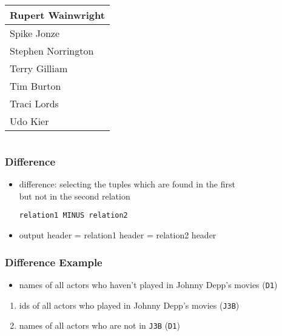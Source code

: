 \documentclass[dvipsnames]{beamer}
\theoremstyle{plain}
\begin{document}
\begin{frame}[fragile]
\begin{columns}[b]
    \begin{tiny}
    \begin{table}
      \begin{tabular}{|l|}\hline
Rupert Wainwright    \\\hline
Spike Jonze          \\\hline
Stephen Norrington   \\\hline
Terry Gilliam        \\\hline
Tim Burton           \\\hline
Traci Lords          \\\hline
Udo Kier             \\\hline
      \end{tabular}
    \end{table}
    \end{tiny}
  \end{columns}
\end{frame}

\begin{frame}[fragile]
  \frametitle{Difference}

  \begin{itemize}
    \item \alert{difference}: selecting the tuples which are found in the first\\
      but not in the second relation
    \begin{lstlisting}
relation1 MINUS relation2
    \end{lstlisting}

    \medskip
    \item output header = relation1 header = relation2 header
  \end{itemize}
\end{frame}

\begin{frame}
  \frametitle{Difference Example}

  \begin{itemize}
    \item names of all actors who haven't played in Johnny Depp's movies
      (\texttt{D1})
  \end{itemize}

  \pause
  \begin{enumerate}
    \item ids of all actors who played in Johnny Depp's movies (\texttt{J3B})

    \pause
    \item names of all actors who are not in \texttt{J3B} (\texttt{D1})
  \end{enumerate}
\end{frame}
\end{document}
